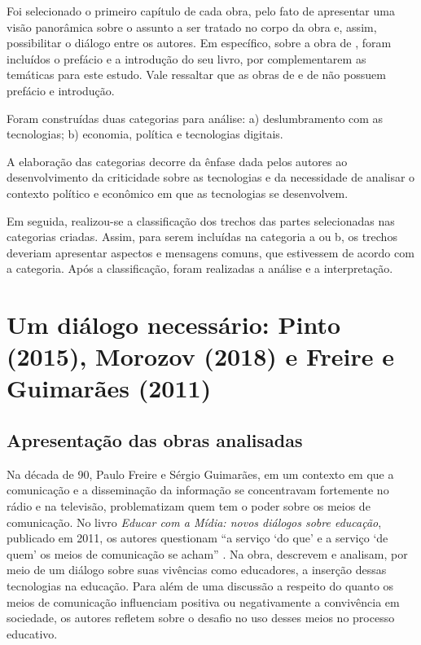 \documentclass[portuguese]{textolivre}
\begin{document}
Foi selecionado o primeiro capítulo de cada obra, pelo fato de apresentar uma visão panorâmica sobre o assunto a ser tratado no corpo da obra e, assim, possibilitar o diálogo entre os autores. Em específico, sobre a obra de \textcite{morozov2018}, foram incluídos o prefácio e a introdução do seu livro, por complementarem as temáticas para este estudo. Vale ressaltar que as obras de \textcite{freire_educar_2011} e de \textcite{pinto_o_2005} não possuem prefácio e introdução.

Foram construídas duas categorias para análise: a) deslumbramento com as tecnologias; b) economia, política e tecnologias digitais. 

A elaboração das categorias decorre da ênfase dada pelos autores ao desenvolvimento da criticidade sobre as tecnologias e da necessidade de analisar o contexto político e econômico em que as tecnologias se desenvolvem.

Em seguida, realizou-se a classificação dos trechos das partes selecionadas nas categorias criadas. Assim, para serem incluídas na categoria a ou b, os trechos deveriam apresentar aspectos e mensagens comuns, que estivessem de acordo com a categoria. Após a classificação, foram realizadas a análise e a interpretação.


\section{Um diálogo necessário: Pinto (2015), Morozov (2018) e Freire e Guimarães (2011)}

\subsection{Apresentação das obras analisadas}

Na década de 90, Paulo Freire e Sérgio Guimarães, em um contexto em que a comunicação e a disseminação da informação se concentravam fortemente no rádio e na televisão, problematizam quem tem o poder sobre os meios de comunicação. No livro \emph{Educar com a Mídia: novos diálogos sobre educação}, publicado em 2011, os autores questionam “a serviço ‘do que’ e a serviço ‘de quem’ os meios de comunicação se acham” \cite[p. 32]{freire_educar_2011}. Na obra, \textcite{freire_educar_2011} descrevem e analisam, por meio de um diálogo sobre suas vivências como educadores, a inserção dessas tecnologias na educação. Para além de uma discussão a respeito do quanto os meios de comunicação influenciam positiva ou negativamente a convivência em sociedade, os autores refletem sobre o desafio no uso desses meios no processo educativo.
\end{document}
